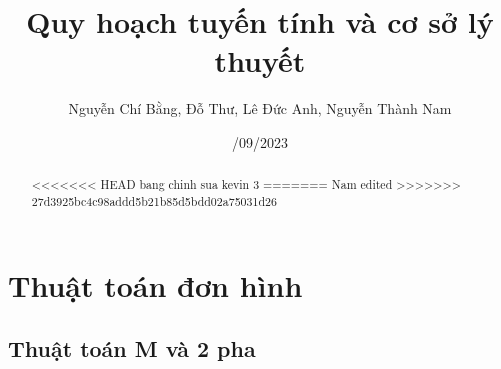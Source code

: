 \documentclass{article}
\title{Quy hoạch tuyến tính và cơ sở lý thuyết}
\author{Nguyễn Chí Bằng, Đỗ Thư, Lê Đức Anh, Nguyễn Thành Nam}
\date{\25/09/2023}
\begin{document}
\maketitle

\begin{abstract}
<<<<<<< HEAD
bang chinh sua kevin 3
=======
Nam edited
>>>>>>> 27d3925bc4c98addd5b21b85d5bdd02a75031d26
\end{abstract}

\tableofcontents

\section{Thuật toán đơn hình}
    \subsection{Thuật toán M và 2 pha}
\end{document}
